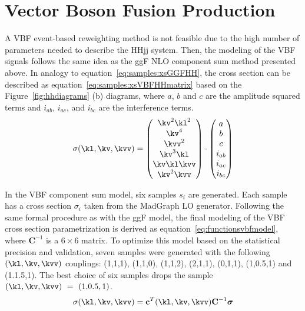 \section{Vector Boson Fusion Production} \label{sec:vbfsignalmodel}
A VBF event-based reweighting method is not feasible due to the high number of parameters needed to describe the HHjj system. Then, the modeling of the VBF signals follows the same idea as the ggF NLO component sum method presented above. In analogy to equation~\ref{eq:samples:xsGGFHH}, the cross section can be described as equation~\ref{eq:samples:xsVBFHHmatrix} based on the Figure~\ref{fig:hhdiagrams} (b) diagrams, where $a$, $b$ and $c$ are the amplitude squared terms and $i_{ab}$, $i_{ac}$, and $i_{bc}$ are the interference terms. 
\begin{equation}
\label{eq:samples:xsVBFHHmatrix}
\sigma(\kl, \kv, \kvv) = 
\begin{pmatrix}
\kv^2\kl^2 \\
\kv^4 \\
\kvv^2 \\
\kv^3\kl \\
\kv\kl\kvv \\
\kv^2\kvv
\end{pmatrix}
\cdot
\begin{pmatrix}
a \\ b \\ c \\ i_{ab} \\ i_{ac} \\ i_{bc}
\end{pmatrix}
\end{equation}

In the VBF component sum model, six samples $s_i$ are generated. Each sample has a cross section $\sigma_i$ taken from the MadGraph LO generator. Following the same formal procedure as with the ggF model, the final modeling of the VBF cross section parametrization is derived as equation~\ref{eq:functionsvbfmodel}, where $\mathbf{C}^{-1}$ is a $6\times6$ matrix. To optimize this model based on the statistical precision and validation, seven samples were generated with the following $(\kl,\kv, \kvv)$ couplings: (1,1,1), (1,1,0), (1,1,2), (2,1,1), (0,1,1), (1,0.5,1) and (1.1.5,1). The best choice of six samples drops the sample $(\kl,\kv, \kvv)~=~(1.0.5,1)$. 
\begin{equation}
\label{eq:functionsvbfmodel}
\sigma(\kl, \kv, \kvv) = \mathbf{c}^{T}(\kl, \kv, \kvv) \mathbf{C}^{-1} \boldsymbol{\sigma}
\end{equation}

